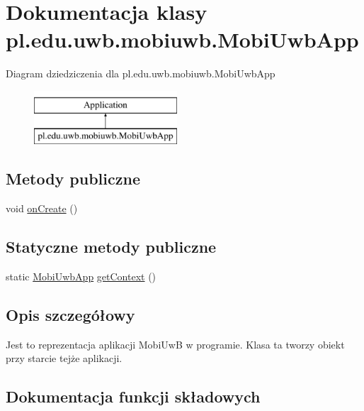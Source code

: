 \hypertarget{classpl_1_1edu_1_1uwb_1_1mobiuwb_1_1_mobi_uwb_app}{}\section{Dokumentacja klasy pl.\+edu.\+uwb.\+mobiuwb.\+Mobi\+Uwb\+App}
\label{classpl_1_1edu_1_1uwb_1_1mobiuwb_1_1_mobi_uwb_app}
Diagram dziedziczenia dla pl.\+edu.\+uwb.\+mobiuwb.\+Mobi\+Uwb\+App\begin{figure}[H]
\begin{center}
\leavevmode
\includegraphics[height=2.000000cm]{classpl_1_1edu_1_1uwb_1_1mobiuwb_1_1_mobi_uwb_app}
\end{center}
\end{figure}
\subsection*{Metody publiczne}
\begin{DoxyCompactItemize}
\item 
void \hyperlink{classpl_1_1edu_1_1uwb_1_1mobiuwb_1_1_mobi_uwb_app_a9d775a6b363ecb0c3e02c8e0c6c63e78}{on\+Create} ()
\end{DoxyCompactItemize}
\subsection*{Statyczne metody publiczne}
\begin{DoxyCompactItemize}
\item 
static \hyperlink{classpl_1_1edu_1_1uwb_1_1mobiuwb_1_1_mobi_uwb_app}{Mobi\+Uwb\+App} \hyperlink{classpl_1_1edu_1_1uwb_1_1mobiuwb_1_1_mobi_uwb_app_a64712bd50dca0848c841b11e9cc41bc8}{get\+Context} ()
\end{DoxyCompactItemize}


\subsection{Opis szczegółowy}
Jest to reprezentacja aplikacji Mobi\+Uw\+B w programie. Klasa ta tworzy obiekt przy starcie tejże aplikacji. 

\subsection{Dokumentacja funkcji składowych}
\hypertarget{classpl_1_1edu_1_1uwb_1_1mobiuwb_1_1_mobi_uwb_app_a64712bd50dca0848c841b11e9cc41bc8}{}
